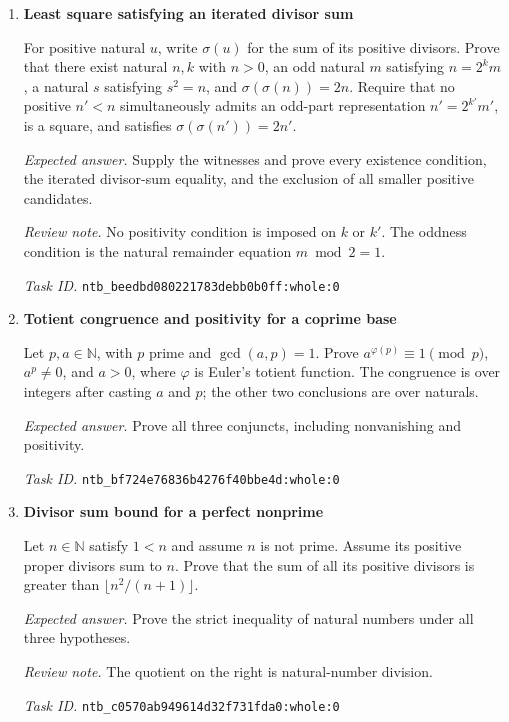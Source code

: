 \documentclass[11pt]{article}
\newcommand{\pth}[1]{\nolinkurl{#1}}
\begin{document}
\begin{enumerate}[label={TEST \arabic*.},leftmargin=4.5em,itemsep=1em]
\emph{Task ID.} \pth{ntb_bb8109462d7df8e0ab8a17eb:whole:0}

\item \textbf{Least square satisfying an iterated divisor sum}\label{qn:test:65}

For positive natural $u$, write $\sigma(u)$ for the sum of its positive divisors. Prove that there exist natural $n,k$ with $n>0$, an odd natural $m$ satisfying $n=2^k m$, a natural $s$ satisfying $s^2=n$, and $\sigma(\sigma(n))=2n$. Require that no positive $n'<n$ simultaneously admits an odd-part representation $n'=2^{k'}m'$, is a square, and satisfies $\sigma(\sigma(n'))=2n'$.

\emph{Expected answer.} Supply the witnesses and prove every existence condition, the iterated divisor-sum equality, and the exclusion of all smaller positive candidates.

\emph{Review note.} No positivity condition is imposed on $k$ or $k'$. The oddness condition is the natural remainder equation $m\bmod2=1$.

\emph{Task ID.} \pth{ntb_beedbd080221783debb0b0ff:whole:0}

\item \textbf{Totient congruence and positivity for a coprime base}\label{qn:test:66}

Let $p,a\in\mathbb N$, with $p$ prime and $\gcd(a,p)=1$. Prove $a^{\varphi(p)}\equiv1\pmod p$, $a^p\ne0$, and $a>0$, where $\varphi$ is Euler's totient function. The congruence is over integers after casting $a$ and $p$; the other two conclusions are over naturals.

\emph{Expected answer.} Prove all three conjuncts, including nonvanishing and positivity.

\emph{Task ID.} \pth{ntb_bf724e76836b4276f40bbe4d:whole:0}

\item \textbf{Divisor sum bound for a perfect nonprime}\label{qn:test:67}

Let $n\in\mathbb N$ satisfy $1<n$ and assume $n$ is not prime. Assume its positive proper divisors sum to $n$. Prove that the sum of all its positive divisors is greater than $\lfloor n^2/(n+1)\rfloor$.

\emph{Expected answer.} Prove the strict inequality of natural numbers under all three hypotheses.

\emph{Review note.} The quotient on the right is natural-number division.

\emph{Task ID.} \pth{ntb_c0570ab949614d32f731fda0:whole:0}


\end{enumerate}
\end{document}
